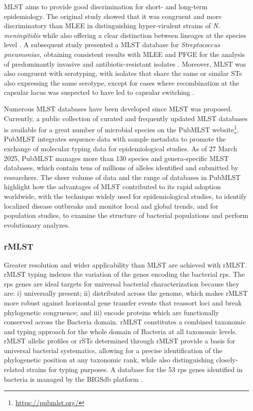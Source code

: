 \ac{MLST} aims to provide good discrimination for short- and long-term epidemiology. The original study showed that it was congruent and more discriminatory than \ac{MLEE} in distinguishing hyper-virulent strains of \textit{N. meningitidis} while also offering a clear distinction between lineages at the species level \cite{enright_multilocus_1999}. A subsequent study presented a \ac{MLST} database for \textit{Streptococcus pneumoniae}, obtaining consistent results with \ac{MLEE} and \ac{PFGE} for the analysis of predominantly invasive and antibiotic-resistant isolates \cite{enright_multilocus_1998}. Moreover, \ac{MLST} was also congruent with serotyping, with isolates that share the same or similar \ac{ST}s also expressing the same serotype, except for cases where recombination at the capsular locus was suspected to have led to capsular switching \cite{enright_multilocus_1999}.

Numerous \ac{MLST} databases have been developed since \ac{MLST} was proposed. Currently, a public collection of curated and frequently updated \ac{MLST} databases is available for a great number of microbial species on the PubMLST website\footnote{\url{https://pubmlst.org/}}. PubMLST integrates sequence data with sample metadata to promote the exchange of molecular typing data for epidemiological studies. As of 27 March 2025, PubMLST manages more than 130 species and genera-specific \ac{MLST} databases, which contain tens of millions of alleles identified and submitted by researchers. The sheer volume of data and the range of databases in PubMLST highlight how the advantages of \ac{MLST} contributed to its rapid adoption worldwide, with the technique widely used for epidemiological studies, to identify localized disease outbreaks and monitor local and global trends, and for population studies, to examine the structure of bacterial populations and perform evolutionary analyzes.

\subsubsection{rMLST}

Greater resolution and wider applicability than \ac{MLST} are achieved with \ac{rMLST}. \ac{rMLST} typing indexes the variation of the genes encoding the bacterial \ac{rps}. The \ac{rps} genes are ideal targets for universal bacterial characterization because they are: i) universally present; ii) distributed across the genome, which makes \ac{rMLST} more robust against horizontal gene transfer events that reassort loci and break phylogenetic congruence; and iii) encode proteins which are functionally conserved across the Bacteria domain. \ac{rMLST} constitutes a combined taxonomic and typing approach for the whole domain of Bacteria at all taxonomic levels. \ac{rMLST} allelic profiles or \acp{rST} determined through \ac{rMLST} provide a basis for universal bacterial systematics, allowing for a precise identification of the phylogenetic position at any taxonomic rank, while also distinguishing closely-related strains for typing purposes. A database for the 53 \ac{rps} genes identified in bacteria is managed by the \ac{BIGSdb} platform \cite{maiden_mlst_2013}.

